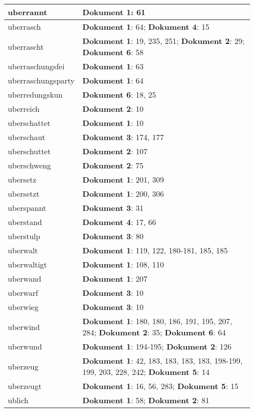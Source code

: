 \documentclass[a5paper]{article}
\begin{document}
\begin{longtable}[l]{|l|p{3in}|}
uberrannt & \textbf{Dokument 1}: 61 \\
\hline
uberrasch & \textbf{Dokument 1}: 64; \textbf{Dokument 4}: 15 \\
\hline
uberrascht & \textbf{Dokument 1}: 19, 235, 251; \textbf{Dokument 2}: 29; \textbf{Dokument 6}: 58 \\
\hline
uberraschungsfei & \textbf{Dokument 1}: 63 \\
\hline
uberraschungsparty & \textbf{Dokument 1}: 64 \\
\hline
uberredungskun & \textbf{Dokument 6}: 18, 25 \\
\hline
uberreich & \textbf{Dokument 2}: 10 \\
\hline
uberschattet & \textbf{Dokument 1}: 10 \\
\hline
uberschaut & \textbf{Dokument 3}: 174, 177 \\
\hline
uberschuttet & \textbf{Dokument 2}: 107 \\
\hline
uberschweng & \textbf{Dokument 2}: 75 \\
\hline
ubersetz & \textbf{Dokument 1}: 201, 309 \\
\hline
ubersetzt & \textbf{Dokument 1}: 200, 306 \\
\hline
uberspannt & \textbf{Dokument 3}: 31 \\
\hline
uberstand & \textbf{Dokument 4}: 17, 66 \\
\hline
uberstulp & \textbf{Dokument 3}: 80 \\
\hline
uberwalt & \textbf{Dokument 1}: 119, 122, 180-181, 185, 185 \\
\hline
uberwaltigt & \textbf{Dokument 1}: 108, 110 \\
\hline
uberwand & \textbf{Dokument 1}: 207 \\
\hline
uberwarf & \textbf{Dokument 3}: 10 \\
\hline
uberwieg & \textbf{Dokument 3}: 10 \\
\hline
uberwind & \textbf{Dokument 1}: 180, 180, 186, 191, 195, 207, 284; \textbf{Dokument 2}: 35; \textbf{Dokument 6}: 64 \\
\hline
uberwund & \textbf{Dokument 1}: 194-195; \textbf{Dokument 2}: 126 \\
\hline
uberzeug & \textbf{Dokument 1}: 42, 183, 183, 183, 183, 198-199, 199, 203, 228, 242; \textbf{Dokument 5}: 14 \\
\hline
uberzeugt & \textbf{Dokument 1}: 16, 56, 283; \textbf{Dokument 5}: 15 \\
\hline
ublich & \textbf{Dokument 1}: 58; \textbf{Dokument 2}: 81 \\

\end{longtable}
\end{document}

